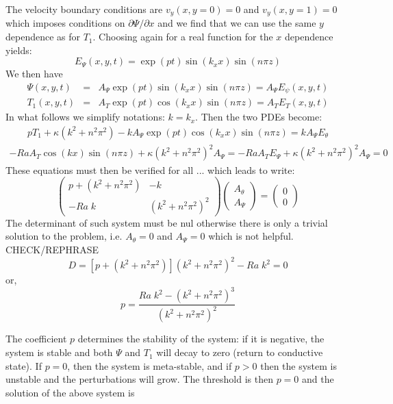 The velocity boundary conditions are $v_y(x,y=0)=0$ and $v_y(x,y=1)=0$ which imposes conditions on $\partial \Psi/\partial x$ and we find that we can use the same $y$ dependence as for $T_1$. 
Choosing again for a real function for the $x$ dependence yields:
\[
E_\Psi(x,y,t) = \exp(pt) \sin(k_x x) \sin(n\pi z)
\]
We then have
\begin{eqnarray}
\Psi(x,y,t) &=& A_\Psi \exp(pt)  \sin(k_x x) \sin(n\pi z)   = A_\Psi E_\psi(x,y,t) \\
T_1(x,y,t)  &=& A_T \exp(pt)  \cos(k_x x) \sin(n\pi z)   = A_T E_T(x,y,t) 
\end{eqnarray}
In what follows we simplify notations: $k=k_x$. Then the two PDEs become:
\begin{eqnarray}
p T_1  + \kappa (k^2 + n^2 \pi^2 )  
-  k A_\Psi \exp(pt) \cos(k_x x) \sin(n\pi z) = k A_\Psi E_\theta 
\end{eqnarray}
\begin{eqnarray}
-Ra A_T \cos(kx) \sin(n\pi z) + \kappa (k^2 + n^2 \pi^2 )^2 A_\Psi = -Ra A_T E_\Psi 
+  \kappa (k^2 + n^2 \pi^2 )^2A_\Psi = 0
\end{eqnarray}
These equations must then be verified for all ...
which leads to write:
\[
\left(
\begin{array}{cc}
p + (k^2+n^2\pi^2) & -k \\
-Ra \; k & (k^2+n^2\pi^2)^2 
\end{array}
\right)
\left(
\begin{array}{c}
A_\theta \\ A_\Psi
\end{array}
\right)
=
\left(
\begin{array}{c}
0 \\ 0
\end{array}
\right)
\]
The determinant of such system must be nul otherwise there is only a trivial solution to the problem, i.e. $A_\theta=0$ and $A_\Psi=0$ which is not helpful. CHECK/REPHRASE
\[
D= [p + (k^2+n^2\pi^2)](k^2+n^2\pi^2)^2 - Ra \; k^2 =0
\]
or, 
\[
p = \frac{Ra \; k^2 -(k^2+n^2\pi^2)^3 }{ (k^2+n^2\pi^2)^2}
\]



The coefficient $p$ determines the stability of the system: if it is negative, the system is stable and both $\Psi$ and $T_1$ will decay to zero (return to conductive state). If $p=0$, then the system is meta-stable, and if $p>0$ then the system is unstable and the perturbations will grow. 
The threshold is then $p=0$ and the solution of the above system is 

